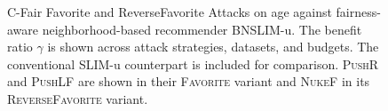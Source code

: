 \begin{figure}
\caption[C-Fair Favorite and ReverseFavorite Attacks on age against fairness-aware neighborhood-based recommender BNSLIM-u]{C-Fair Favorite and ReverseFavorite Attacks on age against fairness-aware neighborhood-based recommender BNSLIM-u. The benefit ratio $\gamma$ is shown across attack strategies, datasets, and budgets. The conventional SLIM-u counterpart is included for comparison. \textsc{PushR} and \textsc{PushLF} are shown in their \textsc{Favorite} variant and \textsc{NukeF} in its \textsc{ReverseFavorite} variant.}
\label{fig:gamma_neighborhood_based_fair_datasets_favorite_age}
\end{figure}
